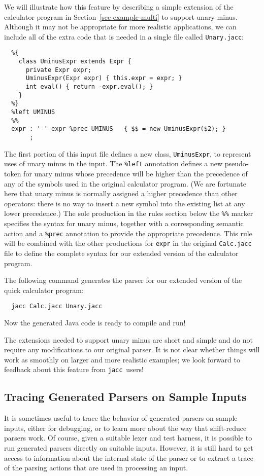 \documentclass[12pt]{article}
\def\jacc{{\tt jacc}}
\begin{document}
We will illustrate how this feature by describing a simple
extension of the calculator program in Section~\ref{sec-example-multi}
to support unary minus.  Although it may not be appropriate for more
realistic applications, we can include all of the extra code that is
needed in a single file called \verb"Unary.jacc":
{\small
\begin{verbatim}
  %{
    class UminusExpr extends Expr {
      private Expr expr;
      UminusExpr(Expr expr) { this.expr = expr; }
      int eval() { return -expr.eval(); }
    }
  %}
  %left UMINUS
  %%
  expr : '-' expr %prec UMINUS   { $$ = new UminusExpr($2); }
       ;
\end{verbatim}
}%
The first portion of this input file defines a new class,
\verb"UminusExpr", to represent uses of unary minus in the input.
The \verb"%left" annotation defines a new pseudo-token for unary minus
whose precedence will be higher than the precedence of any of the
symbols used in the original calculator program.  (We are fortunate
here that unary minus is normally assigned a higher precedence than
other operators: there is no way to insert a new symbol into
the existing list at any lower precedence.)  The sole production in
the rules section below the \verb"%%" marker specifies the syntax for
unary minus, together with a corresponding semantic action and a
\verb"%prec" annotation to provide the appropriate precedence.
This rule will be combined with the other productions
for \verb"expr" in the original \verb"Calc.jacc" file to define the
complete syntax for our extended version of the calculator program.

The following command generates the parser for our extended version
of the quick calculator program:
{\small
\begin{verbatim}
  jacc Calc.jacc Unary.jacc
\end{verbatim}
}%
Now the generated Java code is ready to compile and run!

The extensions needed to support unary minus are short and simple and
do not require any modifications to our original parser.  It is not clear
whether things will work as smoothly on larger and more realistic examples;
we look forward to feedback about this feature from \jacc\ users!

\subsection{Tracing Generated Parsers on Sample Inputs}\label{sec-run}
It is sometimes useful to trace the behavior of generated parsers
on sample inputs, either for debugging, or to learn more about
the way that shift-reduce parsers work.  Of course, given a suitable
lexer and test harness, it is possible to run generated parsers
directly on suitable inputs.  However, it is still hard to get access
to information about the internal state of the parser or to extract a
trace of the parsing actions that are used in processing an input.
\end{document}
